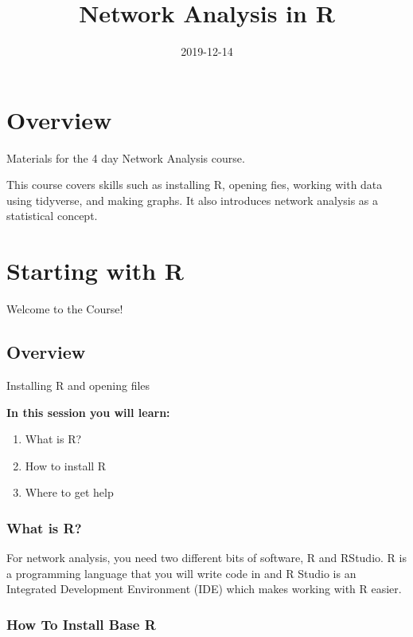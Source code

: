 \documentclass[]{book}
\title{Network Analysis in R}
\author{}
\date{2019-12-14}
\providecommand{\tightlist}{%
  \setlength{\itemsep}{0pt}\setlength{\parskip}{0pt}}
\begin{document}
\maketitle

{
\setcounter{tocdepth}{1}
\tableofcontents
}
\hypertarget{overview}{%
\chapter*{Overview}\label{overview}}

Materials for the 4 day Network Analysis course.

This course covers skills such as installing R, opening fies, working with data using tidyverse, and making graphs. It also introduces network analysis as a statistical concept.

\hypertarget{starting-with-r}{%
\chapter{Starting with R}\label{starting-with-r}}

{Welcome to the Course!}

\hypertarget{overview-1}{%
\section{Overview}\label{overview-1}}

Installing R and opening files

\textbf{In this session you will learn:}

\begin{enumerate}
\def\labelenumi{\arabic{enumi}.}
\tightlist
\item
  What is R?
\item
  How to install R
\item
  Where to get help
\end{enumerate}

\hypertarget{what-is-r}{%
\subsection{What is R?}\label{what-is-r}}

For network analysis, you need two different bits of software, R and RStudio. R is a programming language that you will write code in and R Studio is an Integrated Development Environment (IDE) which makes working with R easier.

\hypertarget{how-to-install-base-r}{%
\subsection{How To Install Base R}\label{how-to-install-base-r}}
\end{document}
